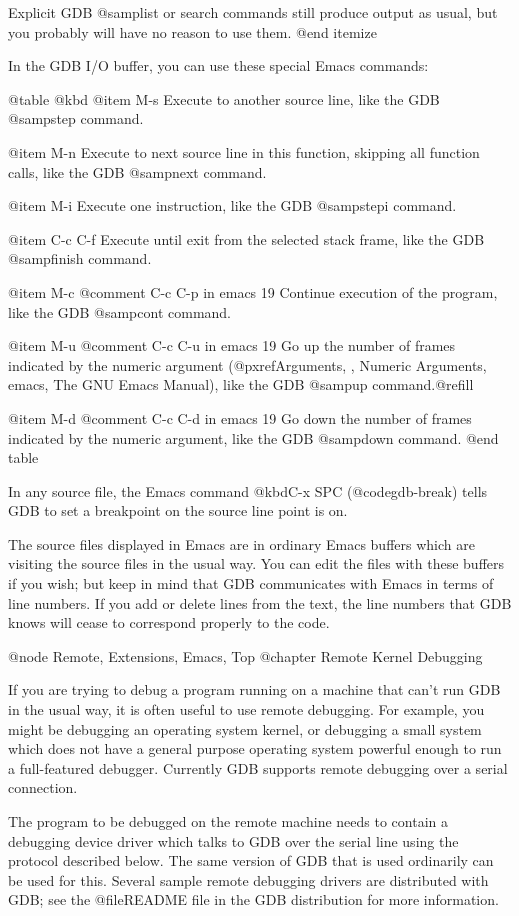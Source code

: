 Explicit GDB @samp{list} or search commands still produce output as
usual, but you probably will have no reason to use them.
@end itemize

In the GDB I/O buffer, you can use these special Emacs commands:

@table @kbd
@item M-s
Execute to another source line, like the GDB @samp{step} command.

@item M-n
Execute to next source line in this function, skipping all function
calls, like the GDB @samp{next} command.

@item M-i
Execute one instruction, like the GDB @samp{stepi} command.

@item C-c C-f
Execute until exit from the selected stack frame, like the GDB
@samp{finish} command.

@item M-c
@comment C-c C-p in emacs 19
Continue execution of the program, like the GDB @samp{cont} command.

@item M-u
@comment C-c C-u in emacs 19
Go up the number of frames indicated by the numeric argument
(@pxref{Arguments, , Numeric Arguments, emacs, The GNU Emacs Manual}),
like the GDB @samp{up} command.@refill

@item M-d
@comment C-c C-d in emacs 19
Go down the number of frames indicated by the numeric argument, like the
GDB @samp{down} command.
@end table

In any source file, the Emacs command @kbd{C-x SPC} (@code{gdb-break})
tells GDB to set a breakpoint on the source line point is on.

The source files displayed in Emacs are in ordinary Emacs buffers
which are visiting the source files in the usual way.  You can edit
the files with these buffers if you wish; but keep in mind that GDB
communicates with Emacs in terms of line numbers.  If you add or
delete lines from the text, the line numbers that GDB knows will cease
to correspond properly to the code.

@node Remote, Extensions, Emacs, Top
@chapter Remote Kernel Debugging

If you are trying to debug a program running on a machine that can't run
GDB in the usual way, it is often useful to use remote debugging.  For
example, you might be debugging an operating system kernel, or debugging
a small system which does not have a general purpose operating system
powerful enough to run a full-featured debugger.  Currently GDB supports
remote debugging over a serial connection.

The program to be debugged on the remote machine needs to contain a
debugging device driver which talks to GDB over the serial line using the
protocol described below.  The same version of GDB that is used ordinarily
can be used for this.  Several sample remote debugging drivers are
distributed with GDB; see the @file{README} file in the GDB distribution for
more information.

